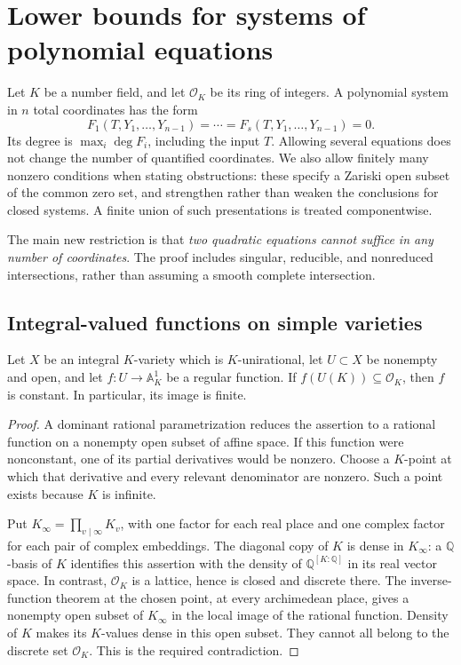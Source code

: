 \section{Lower bounds for systems of polynomial equations}
\label{p3sys:lower-bounds}

Let $K$ be a number field, and let $\mathcal O_K$ be its ring of
integers.  A polynomial system in $n$ total coordinates has the form
\[
 F_1(T,Y_1,\ldots,Y_{n-1})=\cdots
   =F_s(T,Y_1,\ldots,Y_{n-1})=0.
\]
Its degree is $\max_i\deg F_i$, including the input $T$.
Allowing several equations does not change the number of quantified
coordinates.  We also allow finitely many nonzero conditions when
stating obstructions: these specify a Zariski open subset of the common
zero set, and strengthen rather than weaken the conclusions for closed
systems.  A finite union of such presentations is treated componentwise.

The main new restriction is that \emph{two quadratic equations cannot
suffice in any number of coordinates}.  The proof includes singular,
reducible, and nonreduced intersections, rather than assuming a smooth
complete intersection.

\subsection{Integral-valued functions on simple varieties}

\begin{lemma}\label{p3sys:unirational-function}
Let $X$ be an integral $K$-variety which is $K$-unirational, let
$U\subset X$ be nonempty and open, and let $f:U\to\mathbb A^1_K$
be a regular function.  If $f(U(K))\subseteq\mathcal O_K$, then
$f$ is constant.  In particular, its image is finite.
\end{lemma}
\begin{proof}
A dominant rational parametrization reduces the assertion to a rational
function on a nonempty open subset of affine space.  If this function
were nonconstant, one of its partial derivatives would be nonzero.
Choose a $K$-point at which that derivative and every relevant
denominator are nonzero.  Such a point exists because $K$ is infinite.

Put $K_\infty=\prod_{v\mid\infty}K_v$, with one factor for each real
place and one complex factor for each pair of complex embeddings.
The diagonal copy of $K$ is dense in $K_\infty$: a $\mathbb Q$-basis
of $K$ identifies this assertion with the density of
$\mathbb Q^{[K:\mathbb Q]}$ in its real vector space.  In contrast,
$\mathcal O_K$ is a lattice, hence is closed and discrete there.
The inverse-function theorem at the chosen point, at every
archimedean place, gives a nonempty open subset of $K_\infty$ in
the local image of the rational function.  Density of $K$ makes its
$K$-values dense in this open subset.  They cannot all belong to the
discrete set $\mathcal O_K$.  This is the required contradiction.
\end{proof}

